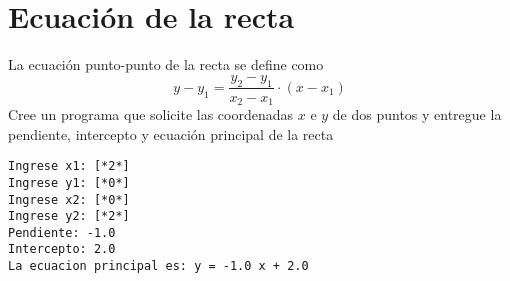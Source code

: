 \section{Ecuación de la recta}
La ecuación punto-punto de la recta se define como 
\begin{displaymath}
y - y_{1}= \frac{y_{2}-y_{1}}{x_{2}-x_{1}} \cdot (x - x_{1})
\end{displaymath}
Cree un programa que solicite las coordenadas $x$ e $y$ de dos puntos y entregue la pendiente, intercepto y ecuación principal de la recta
\begin{lstlisting}[style=consola]
Ingrese x1: [*2*]
Ingrese y1: [*0*]
Ingrese x2: [*0*]
Ingrese y2: [*2*]
Pendiente: -1.0
Intercepto: 2.0
La ecuacion principal es: y = -1.0 x + 2.0
\end{lstlisting}
